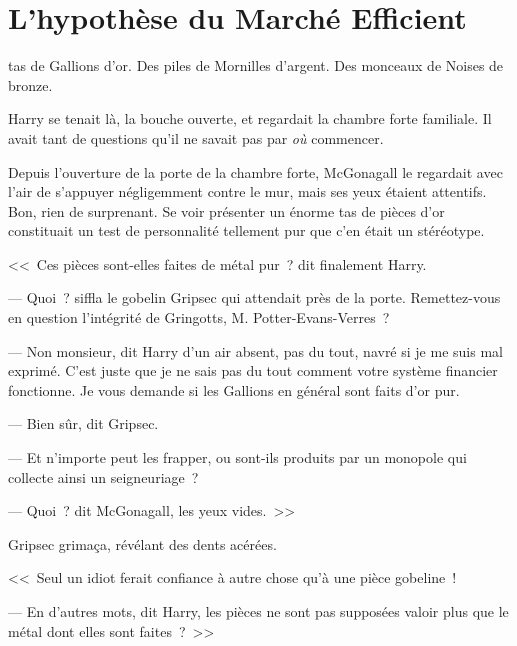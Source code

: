 \chapter[L'hypothèse du Marché Efficient]{L'hypothèse du Marché Efficient\protect\footnotemark}

 tas de Gallions d'or. Des piles de Mornilles d'argent. Des monceaux de Noises de bronze.

\hplettrineextrapara
Harry se tenait là, la bouche ouverte, et regardait la chambre forte familiale. Il avait tant de questions qu'il ne savait pas par \emph{où} commencer.

Depuis l'ouverture de la porte de la chambre forte, McGonagall le regardait avec l'air de s'appuyer négligemment contre le mur, mais ses yeux étaient attentifs. Bon, rien de surprenant. Se voir présenter un énorme tas de pièces d'or constituait un test de personnalité tellement pur que c'en était un stéréotype.

<<~Ces pièces sont-elles faites de métal pur~? dit finalement Harry.

--- Quoi~? siffla le gobelin Gripsec qui attendait près de la porte. Remettez-vous en question l'intégrité de Gringotts, M. Potter-Evans-Verres~?

--- Non monsieur, dit Harry d'un air absent, pas du tout, navré si je me suis mal exprimé. C'est juste que je ne sais pas du tout comment votre système financier fonctionne. Je vous demande si les Gallions en général sont faits d'or pur.

--- Bien sûr, dit Gripsec.

--- Et n'importe peut les frapper, ou sont-ils produits par un monopole qui collecte ainsi un seigneuriage~?

--- Quoi~? dit McGonagall, les yeux vides.~>>

Gripsec grimaça, révélant des dents acérées.

<<~Seul un idiot ferait confiance à autre chose qu'à une pièce gobeline~!

--- En d'autres mots, dit Harry, les pièces ne sont pas supposées valoir plus que le métal dont elles sont faites~?~>>

